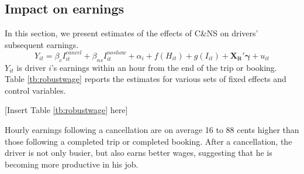 \documentclass[reviewmode]{restat}
\begin{document}
\subsection{Impact on earnings}
In this section, we present estimates of the effects of C\&NS on drivers' subsequent earnings.
\begin{equation}
\label{eq:outcomes}
Y_{it} = \beta_c I^{cancel}_{it} + \beta_{ns} I^{noshow}_{it} + \alpha_i + f(H_{it}) + g(I_{it}) + \mathbf{X_{it}}'\mathbf{\gamma}  + u_{it}
\end{equation}
$Y_{it}$ is driver $i$'s earnings within an hour from the end of the trip or booking. Table \ref{tb:robustwage} 
reports the estimates for various sets of fixed effects and control variables.

\begin{center}
	[Insert Table \ref{tb:robustwage} here]
\end{center}

Hourly earnings following a cancellation are on average 16 to 88 cents higher than those following a 
completed trip or completed booking. After a cancellation, the driver is not only busier, but also earns
better wages, suggesting that he is becoming more productive in his job. 

\end{document}
